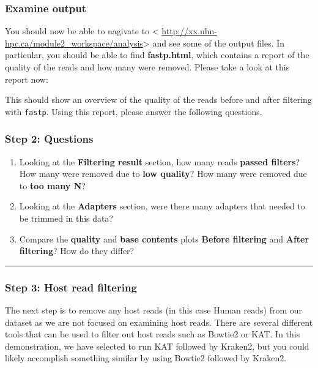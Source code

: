 \documentclass[
]{book}
\providecommand{\tightlist}{%
  \setlength{\itemsep}{0pt}\setlength{\parskip}{0pt}}
\begin{document}
\subsubsection{Examine output}\label{examine-output}

You should now be able to nagivate to \textless{} \url{http://xx.uhn-hpc.ca/module2_workspace/analysis}\textgreater{} and see some of the output files. In particular, you should be able to find \textbf{fastp.html}, which contains a report of the quality of the reads and how many were removed. Please take a look at this report now:

This should show an overview of the quality of the reads before and after filtering with \texttt{fastp}. Using this report, please answer the following questions.

\subsubsection{Step 2: Questions}\label{step-2-questions}

\begin{enumerate}
\def\labelenumi{\arabic{enumi}.}
\tightlist
\item
  Looking at the \textbf{Filtering result} section, how many reads \textbf{passed filters}? How many were removed due to \textbf{low quality}? How many were removed due to \textbf{too many N}?
\item
  Looking at the \textbf{Adapters} section, were there many adapters that needed to be trimmed in this data?
\item
  Compare the \textbf{quality} and \textbf{base contents} plots \textbf{Before filtering} and \textbf{After filtering}? How do they differ?
\end{enumerate}

\begin{center}\rule{0.5\linewidth}{0.5pt}\end{center}

\subsubsection{Step 3: Host read filtering}\label{exercise-host-filtering}

The next step is to remove any host reads (in this case Human reads) from our dataset as we are not focused on examining host reads. There are several different tools that can be used to filter out host reads such as Bowtie2 or KAT. In this demonstration, we have selected to run KAT followed by Kraken2, but you could likely accomplish something similar by using Bowtie2 followed by Kraken2.
\end{document}
